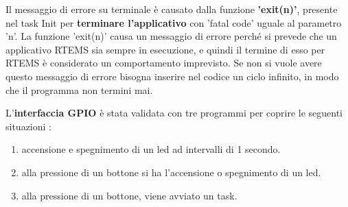 \documentclass[12pt, a4paper, titlepage, oneside]{book}
\begin{document}
Il messaggio di errore su terminale è causato dalla funzione \textbf{'exit(n)'}, presente nel task Init per \textbf{terminare l'applicativo} con 'fatal code' uguale al parametro 'n'.
La funzione 'exit(n)' causa un messaggio di errore perché si prevede che un applicativo RTEMS sia sempre in esecuzione, e quindi il termine di esso per RTEMS è considerato un comportamento imprevisto.
Se non si vuole avere questo messaggio di errore bisogna inserire nel codice un ciclo infinito, in modo che il programma non termini mai.\newline

L'\textbf{interfaccia GPIO }è stata validata con tre programmi per coprire le seguenti situazioni :
\begin{enumerate}
    \item accensione e spegnimento di un led ad intervalli di 1 secondo.
    \item alla pressione di un bottone si ha l'accensione o spegnimento di un led.
    \item alla pressione di un bottone, viene avviato un task.
\end{enumerate}
\end{document}
